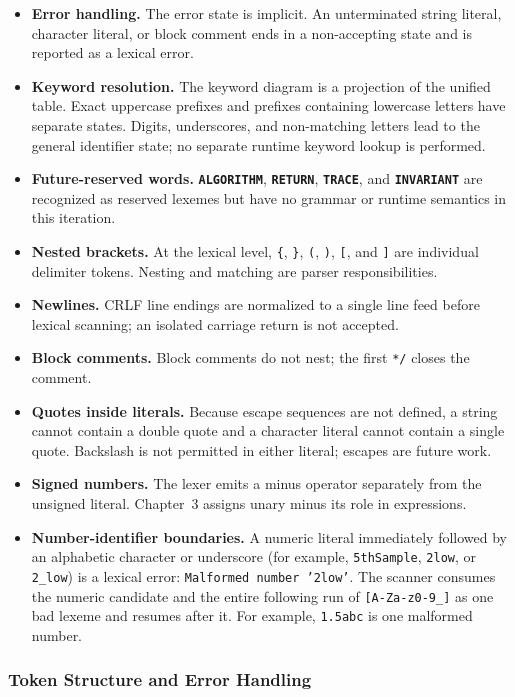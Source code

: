 \documentclass[11pt,a4paper]{article}
\newcommand{\kw}[1]{\texttt{\bfseries\color{pupmaroon}#1}}
\newcommand{\codeinline}[1]{\texttt{#1}}
\begin{document}
\begin{itemize}
  \item \textbf{Error handling.} The error state is implicit. An unterminated string literal, character literal, or block comment ends in a non-accepting state and is reported as a lexical error.
  \item \textbf{Keyword resolution.} The keyword diagram is a projection of the unified table. Exact uppercase prefixes and prefixes containing lowercase letters have separate states. Digits, underscores, and non-matching letters lead to the general identifier state; no separate runtime keyword lookup is performed.
  \item \textbf{Future-reserved words.} \kw{ALGORITHM}, \kw{RETURN}, \kw{TRACE}, and \kw{INVARIANT} are recognized as reserved lexemes but have no grammar or runtime semantics in this iteration.
  \item \textbf{Nested brackets.} At the lexical level, \codeinline{\{}, \codeinline{\}}, \codeinline{(}, \codeinline{)}, \codeinline{[}, and \codeinline{]} are individual delimiter tokens. Nesting and matching are parser responsibilities.
  \item \textbf{Newlines.} CRLF line endings are normalized to a single line feed before lexical scanning; an isolated carriage return is not accepted.
  \item \textbf{Block comments.} Block comments do not nest; the first \codeinline{*/} closes the comment.
  \item \textbf{Quotes inside literals.} Because escape sequences are not defined, a string cannot contain a double quote and a character literal cannot contain a single quote. Backslash is not permitted in either literal; escapes are future work.
  \item \textbf{Signed numbers.} The lexer emits a minus operator separately from the unsigned literal. Chapter~3 assigns unary minus its role in expressions.
  \item \textbf{Number-identifier boundaries.} A numeric literal immediately followed by an alphabetic character or underscore (for example, \codeinline{5thSample}, \codeinline{2low}, or \codeinline{2\_low}) is a lexical error: \codeinline{Malformed number '2low'}. The scanner consumes the numeric candidate and the entire following run of \codeinline{[A-Za-z0-9\_]} as one bad lexeme and resumes after it. For example, \codeinline{1.5abc} is one malformed number.
\end{itemize}

\subsubsection{Token Structure and Error Handling}\label{sec:tokens}
\end{document}
